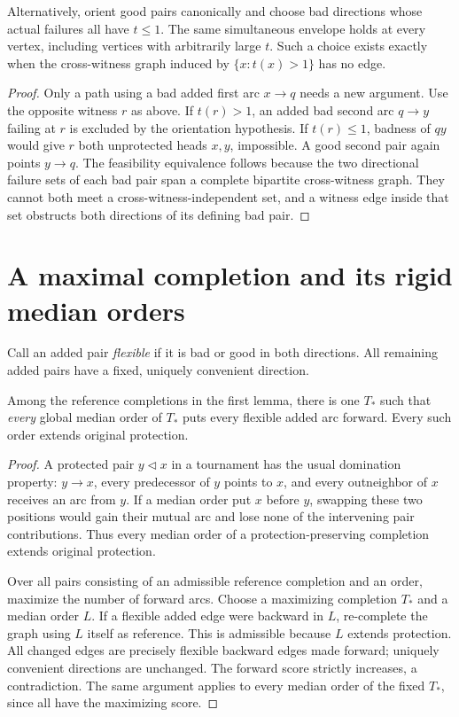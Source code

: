 \begin{lemma}
\label{lem:global-unit-selected-envelope}
Alternatively, orient good pairs canonically and choose bad directions
whose actual failures all have $t\le1$. The same simultaneous envelope
holds at every vertex, including vertices with arbitrarily large $t$.
Such a choice exists exactly when the cross-witness graph induced by
$\{x:t(x)>1\}$ has no edge.
\end{lemma}
\begin{proof}
Only a path using a bad added first arc $x\to q$ needs a new argument.
Use the opposite witness $r$ as above. If $t(r)>1$, an added bad second
arc $q\to y$ failing at $r$ is excluded by the orientation hypothesis.
If $t(r)\le1$, badness of $qy$ would give $r$ both unprotected heads
$x,y$, impossible. A good second pair again points $y\to q$.
The feasibility equivalence follows because the two directional failure
sets of each bad pair span a complete bipartite cross-witness graph.
They cannot both meet a cross-witness-independent set, and a witness
edge inside that set obstructs both directions of its defining bad pair.
\end{proof}

\section{A maximal completion and its rigid median orders}
\label{sec:global-maximal-completion}

Call an added pair \emph{flexible} if it is bad or good in both directions.
All remaining added pairs have a fixed, uniquely convenient direction.

\begin{lemma}
\label{lem:global-max-reference-median}
Among the reference completions in the first lemma, there is one $T_*$
such that \emph{every} global median order of $T_*$ puts every flexible
added arc forward. Every such order extends original protection.
\end{lemma}
\begin{proof}
A protected pair $y\triangleleft x$ in a tournament has the usual
domination property: $y\to x$, every predecessor of $y$ points to $x$,
and every outneighbor of $x$ receives an arc from $y$. If a median order
put $x$ before $y$, swapping these two positions would gain their mutual
arc and lose none of the intervening pair contributions. Thus every
median order of a protection-preserving completion extends original
protection.

Over all pairs consisting of an admissible reference completion and
an order, maximize the number of forward arcs. Choose a maximizing
completion $T_*$ and a median order $L$. If a flexible added edge were
backward in $L$, re-complete the graph using $L$ itself as reference.
This is admissible because $L$ extends protection. All changed edges
are precisely flexible backward edges made forward; uniquely convenient
directions are unchanged. The forward score strictly increases, a
contradiction. The same argument applies to every median order of the
fixed $T_*$, since all have the maximizing score.
\end{proof}

